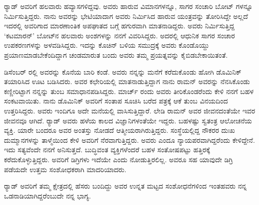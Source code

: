 ರ‍್ಯಾಡ್ ಅವರಿಗೆ ಹಲವಾರು ಹವ್ಯಾಸಗಳಿದ್ದವು. ಅವರು ಹಾರುವ ವಿಮಾನಗಳನ್ನೂ, ಸಾಗರ ಸಂಚಾರಿ ಬೋಟ್ ಗಳನ್ನೂ ನಿರ್ಮಿಸುತ್ತಿದ್ದರು. ನಾನು ಅವರನ್ನು ಭೇಟಿಯಾದಾಗ ಅವರು ನಿರ್ಮಿಸಿದ ಹಾರುವ ಯಂತ್ರವನ್ನು ತೋರಿಸಿದ್ದೇ ಅಲ್ಲದೆ ಇದರಲ್ಲಿ ಅವರಿಗಾದ ಮಾರಣಾಂತಿಕ ಅಪಘಾತದ ಬಗ್ಗೆ ಹಗುರವಾಗಿ ಮಾತನಾಡಿದ್ದರು. ಅವರು ನಿರ್ಮಿಸುತ್ತಿದ್ದ ‘ಕಟಮಾರನ್’ ಬೋಟ್‍ನ ಹಲವಾರು ಅಂಶಗಳನ್ನು ನನಗೆ ವಿವರಿಸಿದ್ದರು. ಅದರಲ್ಲಿ ಆಧುನಿಕ ಸಾಗರ ಸಂಚಾರ ಉಪಕರಣಗಳನ್ನು ಅಳವಡಿಸಿದ್ದರು. ಇದನ್ನು ಕೊಚಿನ್ ಬಳಿಯ ಸಮುದ್ರಕ್ಕೆ ಅವರು ಕೊಂಡೊಯ್ದು ಪ್ರಯಾಣಮಾಡಬೇಕೆಂದಿದ್ದಾಗ ಚಂಡಮಾರುತ ಬಂದು ಅವರು ತಮ್ಮ ಪ್ರಯತ್ನವನ್ನು ಕೈಬಿಡ\-ಬೇಕಾಯಿತಂತೆ.

ಡಿಸೆಂಬರ್ ರಲ್ಲಿ ಅವರನ್ನು ಕೊನೆಯ ಬಾರಿ ಕಂಡೆ. ಅವರು ನನ್ನನ್ನು ಮನೆಗೆ ಕರೆದುಕೊಂಡು ಹೋಗಿ ಡೊಮಿನಿಕ್ ತಯಾರಿಸಿದ ಊಟ ಬಡಿಸಿದರು. ಅವರ ಕಛೇರಿಯಲ್ಲಿ ಮಾತನಾಡುತ್ತಿದ್ದಾಗ ನಾನು ರಾಮನ್ ಅವರನ್ನು ನೆನಸಿಕೊಂಡು ಕಣ್ಣೀರಿಟ್ಟಾಗ ನನ್ನನ್ನು ತುಂಬ ಸಮಾಧಾನಪಡಿಸಿದ್ದರು.  ಮಾರ್ಚ್  ರಂದು ಅವರು ತೀರಿಕೊಂಡರೆಂದು ಕೇಳಿ ನನಗೆ ಬಹಳ ಸಂಕಟವಾಯಿತು. ನಾನು ಡೊಮಿನಿಕ್ ಅವರಿಗೆ ಸಂತಾಪ ಸೂಚಿಸಿ ಬರೆದ ಪತ್ರಕ್ಕೆ ಆಕೆ ತುಂಬ ವಿನಯದಿಂದ ಉತ್ತರಿಸಿದ್ದರು. ಅವರು ಇಂದಿಗೂ ಅದೇ ಮನೆಯಲ್ಲಿ ವಾಸಿಸುತ್ತಿದ್ದಾರೆ. ಲೇಡಿ ರಾಮನ್ ಅವರ ಜೀವನದಂತೆಯೇ ಇವರ ಜೀವನವೂ ಆಗಿದೆ. ರ‍್ಯಾಡ್ ಅವರು ಹಳೆಯ ಕಾಲದ ವಿಜ್ಞಾನಿಗಳಂತೆಯೇ ಇದ್ದರು. ಬಹಳಷ್ಟು ಸ್ವತಂತ್ರ ಆಲೋಚನೆಯ ವ್ಯಕ್ತಿ. ಯಾರೇ ಬಂದರೂ ಅವರ ಅಂತಸ್ತು ನೋಡದೆ ಆತ್ಮೀಯರಾಗಿರುತ್ತಿದ್ದರು. ಸಂಸ್ಥೆಯಲ್ಲಿದ್ದ ನೌಕರರ ದುಃಖ ದುಮ್ಮಾನಗಳನ್ನು ತಾಳ್ಮೆಯಿಂದ ಕೇಳಿ ಅವರಿಗೆ ನೆರವಾಗುತ್ತಿದ್ದರು. ಅವರು ಎಂದೂ ನ್ಯಾಯಪರವಾಗಿದ್ದರೆಂದು ಕೇಳಿದ್ದೇನೆ. ಇದು ಸತ್ಯವೆಂದೇ ನನಗೆ ಅನಿಸುತ್ತದೆ. ಬುದ್ಧಿವಂತ ವ್ಯಕ್ತಿಗಳೆಂದರೆ ಬಹಳ ಸಂತೋಷಪಟ್ಟು ಹತ್ತಿರಕ್ಕೆ ಕರೆದುಕೊಳ್ಳುತ್ತಿದ್ದರು. ಅವರಿಗೆ ಡಿಗ್ರಿಗಳು ಇದೆಯೇ ಎಂದು ನೋಡುತ್ತಿರಲಿಲ್ಲ. ಅವರೂ ಸಹ ಯಾವುದೇ ಡಿಗ್ರಿ ಪಡೆಯದೇ ಉತ್ತಮ ಸಂಶೋಧಕರಾಗಿ ಮಾದರಿಯಾದರು.

\newpage

ರ‍್ಯಾಡ್ ಅವರಿಗೆ ತಮ್ಮ ಕ್ಷೇತ್ರದಲ್ಲಿ ಹೆಸರು ಬಂದಿದ್ದು ಅವರ ಉನ್ನತ ಮಟ್ಟದ ಸಂಶೋಧನೆಗಳಿಂದ ಇಂತಹವರು ನನ್ನ ಒಡನಾಡಿಯಾಗಿದ್ದರೆಂಬುದೇ ನನ್ನ ಭಾಗ್ಯ.

